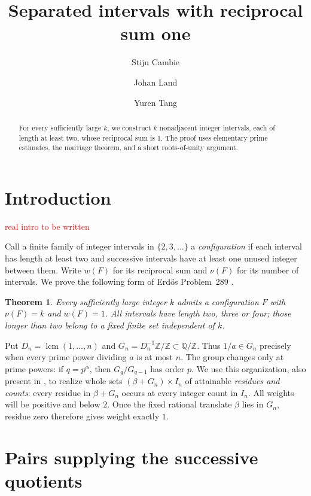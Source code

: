 \documentclass[11pt]{article}
\title{Separated intervals with reciprocal sum one}
\author{Stijn Cambie \and Johan Land \and Yuren Tang}\date{}
\makeatletter
\newtheorem{theorem}{Theorem}
\newcommand{\Z}{\mathbb Z}
\newcommand{\Q}{\mathbb Q}
\DeclareMathOperator{\lcm}{lcm}
\renewcommand{\maketitle}{%
 \begin{center}{\LARGE\@title\par}\end{center}\vspace{.35\baselineskip}}
\makeatother
\begin{document}
\maketitle
\begin{abstract}
For every sufficiently large \(k\), we construct \(k\) nonadjacent
integer intervals, each of length at least two, whose reciprocal sum
is \(1\). The proof uses elementary prime estimates, the marriage
theorem, and a short roots-of-unity argument. 
\end{abstract}


\section{Introduction}


\textcolor{red}{real intro to be written}

Call a finite family of integer intervals in \(\{2,3,\ldots\}\)
a \emph{configuration} if each interval has length at least two
and successive intervals have at least one unused integer between them.
Write \(w(F)\) for its reciprocal sum and \(\nu(F)\) for its number of
intervals. We prove the following form of Erd\H{o}s Problem~289
\cite{EG}.

\begin{theorem}\label{main}
Every sufficiently large integer \(k\) admits a configuration \(F\)
with \(\nu(F)=k\) and \(w(F)=1\).
All intervals have length two, three or four; those longer than two
belong to a fixed finite set independent of \(k\).
\end{theorem}

Put \(D_n=\lcm(1,\ldots,n)\) and
\(G_n=D_n^{-1}\Z/\Z\subset\Q/\Z\).
Thus \(1/a\in G_n\) precisely when every prime power dividing \(a\)
is at most \(n\). The group changes only at prime powers:
if \(q=p^\alpha\), then \(G_q/G_{q-1}\) has order \(p\).
We use this organization, also present in \cite{Land,Tang}, to
realize whole sets \((\beta+G_n)\times I_n\) of attainable
\emph{residues and counts}: every residue in \(\beta+G_n\)
occurs at every integer count in \(I_n\).
All weights will be positive and below \(2\).
Once the fixed rational translate \(\beta\) lies in \(G_n\),
residue zero therefore gives weight exactly \(1\).

\section{Pairs supplying the successive quotients}
\end{document}
